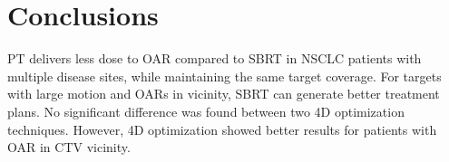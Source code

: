 \documentclass[type=dr, dr=rernat, accentcolor=tud7b,colorbacktitle, bigchapter, openright, twoside, 12pt ]{tudthesis}
\begin{document}
\section{Conclusions}


PT delivers less dose to OAR compared to SBRT in NSCLC patients with multiple disease sites, while maintaining the same target coverage. 
For targets with large motion and OARs in vicinity, SBRT can generate better treatment plans.
No significant difference was found between two 4D optimization techniques. However, 4D optimization showed better results for patients with OAR in CTV vicinity.



{}
% 
\end{document}
